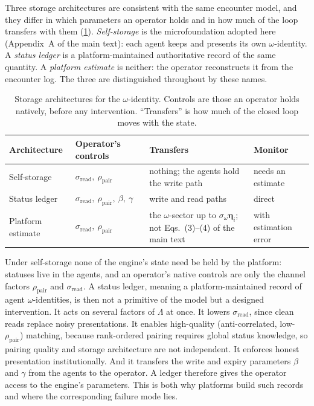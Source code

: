 \documentclass[
  aps,prx,
  preprint,
  superscriptaddress,
  nofootinbib
]{revtex4-2}
\newcommand{\rhopair}{\rho_{\mathrm{pair}}}
\newcommand{\sread}{\sigma_{\mathrm{read}}}
\newcommand{\sidn}{\sigma_{\omega}}
\begin{document}
\noindent Three storage architectures are consistent with the same encounter model, and they differ in which parameters an operator holds and in how much of the loop transfers with them (\cref{tab:storage}). \emph{Self-storage} is the microfoundation adopted here (Appendix~A of the main text): each agent keeps and presents its own $\omega$-identity. A \emph{status ledger} is a platform-maintained authoritative record of the same quantity. A \emph{platform estimate} is neither: the operator reconstructs it from the encounter log. The three are distinguished throughout by these names.

\begin{table}[h]
\centering
\caption{Storage architectures for the $\omega$-identity. Controls are those an operator holds natively, before any intervention. ``Transfers'' is how much of the closed loop moves with the state.}
\label{tab:storage}
\begin{ruledtabular}
\begin{tabular}{l l p{} l}
Architecture & Operator's controls & Transfers & Monitor \\
\hline
Self-storage & $\sread,\ \rhopair$ & nothing; the agents hold the write path & needs an estimate \\
Status ledger & $\sread,\ \rhopair,\ \beta,\ \gamma$ & write and read paths & direct \\
Platform estimate & $\sread,\ \rhopair$ & the $\omega$-sector up to $\sidn\bm\eta_i$; not Eqs.~(3)--(4) of the main text & with estimation error \\
\end{tabular}
\end{ruledtabular}
\end{table}

\noindent Under self-storage none of the engine's state need be held by the platform: statuses live in the agents, and an operator's native controls are only the channel factors $\rhopair$ and $\sread$. A status ledger, meaning a platform-maintained record of agent $\omega$-identities, is then not a primitive of the model but a designed intervention. It acts on several factors of $\Lambda$ at once. It lowers $\sread$, since clean reads replace noisy presentations. It enables high-quality (anti-correlated, low-$\rhopair$) matching, because rank-ordered pairing requires global status knowledge, so pairing quality and storage architecture are not independent. It enforces honest presentation institutionally. And it transfers the write and expiry parameters $\beta$ and $\gamma$ from the agents to the operator. A ledger therefore gives the operator access to the engine's parameters. This is both why platforms build such records and where the corresponding failure mode lies.
\end{document}
